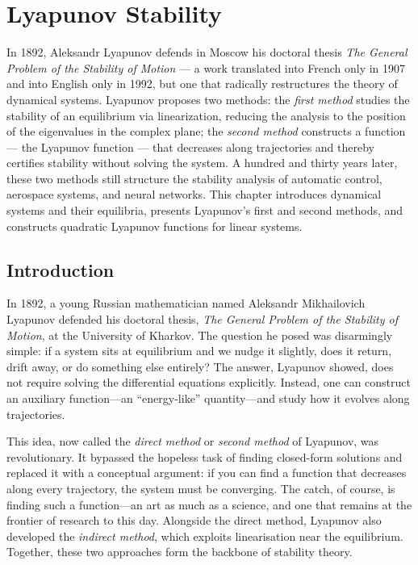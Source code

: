 \chapter{Lyapunov Stability}
\label{ch:lyapunov}

In 1892, Aleksandr Lyapunov defends in Moscow his doctoral thesis \emph{The General Problem of the Stability of Motion} --- a work translated into French only in 1907 and into English only in 1992, but one that radically restructures the theory of dynamical systems. Lyapunov proposes two methods: the \emph{first method} studies the stability of an equilibrium via linearization, reducing the analysis to the position of the eigenvalues in the complex plane; the \emph{second method} constructs a function --- the Lyapunov function --- that decreases along trajectories and thereby certifies stability without solving the system. A hundred and thirty years later, these two methods still structure the stability analysis of automatic control, aerospace systems, and neural networks. This chapter introduces dynamical systems and their equilibria, presents Lyapunov's first and second methods, and constructs quadratic Lyapunov functions for linear systems.

\section{Introduction}

In 1892, a young Russian mathematician named Aleksandr Mikhailovich Lyapunov defended his doctoral thesis, \emph{The General Problem of the Stability of Motion}, at the University of Kharkov. The question he posed was disarmingly simple: if a system sits at equilibrium and we nudge it slightly, does it return, drift away, or do something else entirely? The answer, Lyapunov showed, does not require solving the differential equations explicitly. Instead, one can construct an auxiliary function---an ``energy-like'' quantity---and study how it evolves along trajectories.

This idea, now called the \emph{direct method} or \emph{second method} of Lyapunov, was revolutionary. It bypassed the hopeless task of finding closed-form solutions and replaced it with a conceptual argument: if you can find a function that decreases along every trajectory, the system must be converging. The catch, of course, is finding such a function---an art as much as a science, and one that remains at the frontier of research to this day. Alongside the direct method, Lyapunov also developed the \emph{indirect method}, which exploits linearisation near the equilibrium. Together, these two approaches form the backbone of stability theory.

